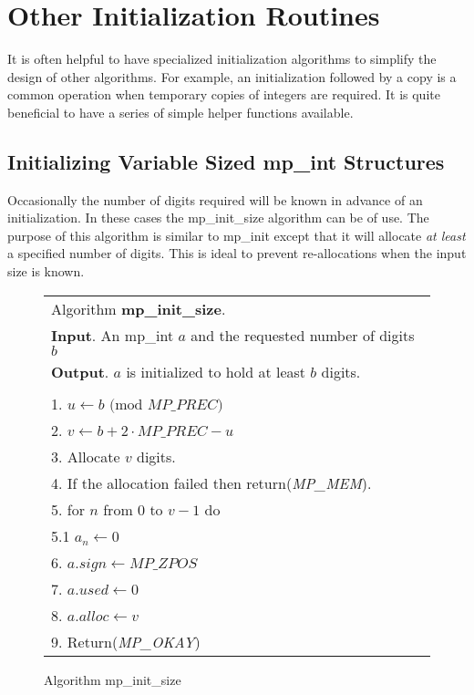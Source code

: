 \documentclass[b5paper]{book}
\begin{document}
\section{Other Initialization Routines}

It is often helpful to have specialized initialization algorithms to simplify the design of other algorithms.  For example, an 
initialization followed by a copy is a common operation when temporary copies of integers are required.  It is quite
beneficial to have a series of simple helper functions available.

\subsection{Initializing Variable Sized mp\_int Structures}
Occasionally the number of digits required will be known in advance of an initialization.  In these
cases the mp\_init\_size algorithm can be of use.  The purpose of this algorithm is similar to mp\_init except that 
it will allocate \textit{at least} a specified number of digits.  This is ideal to prevent re-allocations when the 
input size is known.

\newpage\begin{figure}[here]
\begin{center}
\begin{tabular}{l}
\hline Algorithm \textbf{mp\_init\_size}. \\
\textbf{Input}.   An mp\_int $a$ and the requested number of digits $b$\\
\textbf{Output}.  $a$ is initialized to hold at least $b$ digits. \\
\hline \\
1.  $u \leftarrow b\mbox{ (mod }MP\_PREC\mbox{)}$ \\
2.  $v \leftarrow b + 2 \cdot MP\_PREC - u$ \\
3.  Allocate $v$ digits. \\
4.  If the allocation failed then return(\textit{MP\_MEM}). \\
5.  for $n$ from $0$ to $v - 1$ do \\
\hspace{3mm}5.1  $a_n \leftarrow 0$ \\
6.  $a.sign \leftarrow MP\_ZPOS$\\
7.  $a.used \leftarrow 0$\\
8.  $a.alloc \leftarrow v$\\
9.  Return(\textit{MP\_OKAY})\\
\hline
\end{tabular}
\end{center}
\caption{Algorithm mp\_init\_size}
\end{figure}
\end{document}
